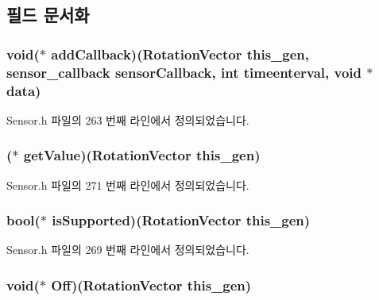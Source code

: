 \subsection{필드 문서화}
\hypertarget{struct___rotation_vector_ad472cb3e9a46a2c39e0e816eefedb549}{
\subsubsection[{add\-Callback}]{\setlength{\rightskip}{0pt plus 5cm}void($\ast$  add\-Callback)({\bf Rotation\-Vector} this\-\_\-gen, {\bf sensor\-\_\-callback} sensor\-Callback, int timeenterval, void $\ast$data)}}\label{struct___rotation_vector_ad472cb3e9a46a2c39e0e816eefedb549}


Sensor.\-h 파일의 263 번째 라인에서 정의되었습니다.

\hypertarget{struct___rotation_vector_ac37bd4354c04172e326f5c6f86580785}{
\subsubsection[{get\-Value}]{($\ast$  get\-Value)({\bf Rotation\-Vector} this\-\_\-gen)}}\label{struct___rotation_vector_ac37bd4354c04172e326f5c6f86580785}


Sensor.\-h 파일의 271 번째 라인에서 정의되었습니다.

\hypertarget{struct___rotation_vector_a6064cf9c8ed8eeb39afea3993119d471}{
\subsubsection[{is\-Supported}]{\setlength{\rightskip}{0pt plus 5cm}bool($\ast$  is\-Supported)({\bf Rotation\-Vector} this\-\_\-gen)}}\label{struct___rotation_vector_a6064cf9c8ed8eeb39afea3993119d471}


Sensor.\-h 파일의 269 번째 라인에서 정의되었습니다.

\hypertarget{struct___rotation_vector_ab4af77a4f32af8d4001b111cb630c1e6}{
\subsubsection[{Off}]{\setlength{\rightskip}{0pt plus 5cm}void($\ast$  Off)({\bf Rotation\-Vector} this\-\_\-gen)}}\label{struct___rotation_vector_ab4af77a4f32af8d4001b111cb630c1e6}


